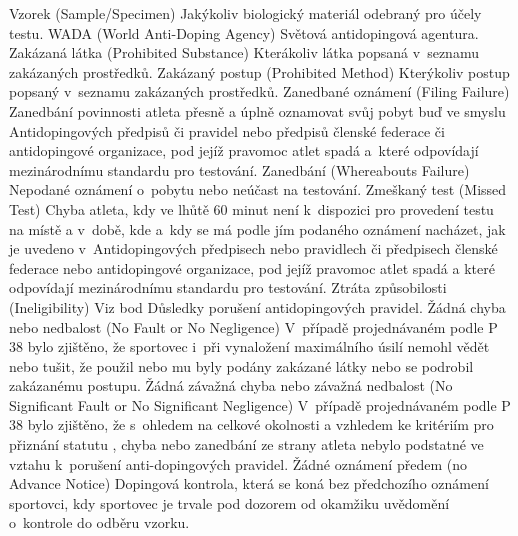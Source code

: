 \dend
\dt Vzorek (Sample/Specimen)
\dd Jakýkoliv biologický materiál odebraný pro účely testu.
\dend
\dt WADA (World Anti-Doping Agency)
\dd Světová antidopingová agentura.
\dend
\dt Zakázaná látka (Prohibited Substance)
\dd Kterákoliv látka popsaná v~seznamu zakázaných prostředků.
\dend
\dt Zakázaný postup (Prohibited Method)
\dd Kterýkoliv postup popsaný v~seznamu zakázaných prostředků.
\dend
\dt Zanedbané oznámení (Filing Failure)
\dd Zanedbání povinnosti atleta přesně a úplně oznamovat svůj pobyt buď ve smyslu Antidopingových předpisů či pravidel nebo předpisů členské federace či antidopingové organizace, pod jejíž pravomoc atlet spadá a~které odpovídají mezinárodnímu standardu pro testování.
\dend
\dt Zanedbání (Whereabouts Failure)
\dd Nepodané oznámení o~pobytu nebo neúčast na testování.
\dend
\dt Zmeškaný test (Missed Test)
\dd Chyba atleta, kdy ve lhůtě 60 minut není k~dispozici pro provedení testu na místě a v~době, kde a~kdy se má podle jím podaného oznámení nacházet, jak je uvedeno v~Antidopingových předpisech nebo pravidlech či předpisech členské federace nebo antidopingové organizace, pod jejíž pravomoc atlet spadá a které odpovídají mezinárodnímu standardu pro testování.
\dend
\dt Ztráta způsobilosti (Ineligibility)
\dd Viz bod Důsledky porušení antidopingových pravidel.
\dend
\dt Žádná chyba nebo nedbalost (No Fault or No Negligence)
\dd V~případě projednávaném podle P 38 bylo zjištěno, že sportovec i~při vynaložení maximálního úsilí nemohl vědět nebo tušit, že použil nebo mu byly podány zakázané látky nebo se podrobil zakázanému postupu.
\dend
\dt Žádná závažná chyba nebo závažná nedbalost (No Significant Fault or No Significant Negligence)
\dd V~případě projednávaném podle P 38 bylo zjištěno, že s~ohledem na celkové okolnosti a vzhledem ke kritériím pro přiznání statutu , chyba nebo zanedbání ze strany atleta nebylo podstatné ve vztahu k~porušení anti-dopingových pravidel.
\dend
\dt Žádné oznámení předem (no Advance Notice)
\dd Dopingová kontrola, která se koná bez předchozího oznámení sportovci, kdy sportovec je trvale pod dozorem od okamžiku uvědomění o~kontrole do odběru vzorku.
\dend

\endinput